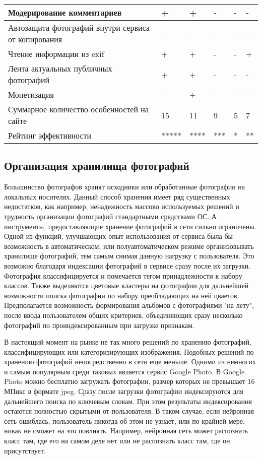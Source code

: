 \begin{table}[H]
\begin{spacing}{1}
\begin{tabular}{|p{3cm}|p{2.5cm}|p{2.5cm}|p{2.5cm}|p{2.5cm}|p{2.5cm}|}
  \hline Модерирование комментариев & + & + & - & - & - \\ 
  \hline Автозащита фотографий внутри сервиса от копирования & - & - & - & - & - \\ 
  \hline Чтение информации из exif & + & + & - & - & + \\ 
  \hline Лента актуальных публичных фотографий & + & + & - & - & - \\ 
  \hline Монетизация & - & + & - & - & - \\ 
  \hline Суммарное количество особенностей на сайте & 15 & 11 & 9 & 5 & 7 \\ 
  \hline Рейтинг эффективности & ***** & **** & *** & * & ** \\
  \hline
  \end{tabular}
  \end{spacing}
\end{table}

\subsection{Организация хранилища фотографий}

Большинство фотографов хранят исходники или обработанные фотографии на локальных носителях.
Данный способ хранения имеет ряд существенных недостатков, как например, ненадежность массово используемых решений и трудность организации фотографий стандартными средствами ОС.
А инструменты, предоставляющие хранение фотографий в сети сильно ограничены.
Одной из функций, улучшающих опыт использования от сервиса была бы возможность в автоматическом, или полуавтоматическом режиме организовывать хранилище фотографий, тем самым снимая данную нагрузку с пользователя.
Это возможно благодаря индексации фотографий в сервисе сразу после их загрузки. 
Фотография классифицируется и помечается тегом принадлежности к набору классов.
Также выделяются цветовые кластеры на фотографии для дальнейшей возможности поиска фотографии по набору преобладающих на ней цваетов.
Предполагается возможность формирования альбомов с фотографиями "на лету", после ввода пользователем общих критериев, объединяющих сразу несколько фотографий по проиндексированным при загрузке признакам.


В настоящий момент на рынке не так много решений по хранению фотографий, классифицирующих или категоризирующих изображения.
Подобных решений по хранению фотографий непосредственно в сети еще меньше.
Одними из немногих и самым популярным среди таковых является сервис Google Photo. 
В Google Photo можно бесплатно загружать фотографии, размер которых не превышает 16 МПикс в формате jpeg. 
Сразу после загрузки фотографии индексируются для дальнейшего поиска по ключевым словам.
При этом результаты индексирования остаются полностью скрытыми от пользователя. 
В таком случае, если нейронная сеть ошиблась, пользователь никогда об этом не узнает, или по крайней мере, никак не сможет на это повлиять. 
Например, нейронная сеть может распознать класс там, где его на самом деле нет или не распознать класс там, где он присутствует.

